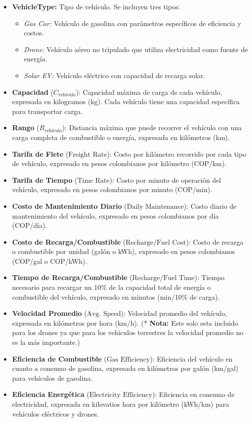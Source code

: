 \documentclass[12pt]{article}
\begin{document}
\begin{itemize}
    \item \textbf{VehicleType:} Tipo de vehículo. Se incluyen tres tipos:
    \begin{itemize}
        \item \textit{Gas Car:} Vehículo de gasolina con parámetros específicos de eficiencia y costos.
        \item \textit{Drone:} Vehículo aéreo no tripulado que utiliza electricidad como fuente de energía.
        \item \textit{Solar EV:} Vehículo eléctrico con capacidad de recarga solar.
    \end{itemize}
    \item \textbf{Capacidad} ($C_{\text{vehículo}}$): Capacidad máxima de carga de cada vehículo, expresada en kilogramos (kg). Cada vehículo tiene una capacidad específica para transportar carga.
    \item \textbf{Rango} ($R_{\text{vehículo}}$): Distancia máxima que puede recorrer el vehículo con una carga completa de combustible o energía, expresada en kilómetros (km).
    \item \textbf{Tarifa de Flete} ($\text{Freight Rate}$): Costo por kilómetro recorrido por cada tipo de vehículo, expresado en pesos colombianos por kilómetro (COP/km).
    \item \textbf{Tarifa de Tiempo} ($\text{Time Rate}$): Costo por minuto de operación del vehículo, expresado en pesos colombianos por minuto (COP/min).
    \item \textbf{Costo de Mantenimiento Diario} ($\text{Daily Maintenance}$): Costo diario de mantenimiento del vehículo, expresado en pesos colombianos por día (COP/día).
    \item \textbf{Costo de Recarga/Combustible} ($\text{Recharge/Fuel Cost}$): Costo de recarga o combustible por unidad (galón o kWh), expresado en pesos colombianos (COP/gal o COP/kWh).
    \item \textbf{Tiempo de Recarga/Combustible} ($\text{Recharge/Fuel Time}$): Tiempo necesario para recargar un 10\% de la capacidad total de energía o combustible del vehículo, expresado en minutos (min/10\% de carga).
    \item \textbf{Velocidad Promedio} ($\text{Avg. Speed}$): Velocidad promedio del vehículo, expresada en kilómetros por hora (km/h). (* \textbf{Nota:} Este solo esta incluido para los drones ya que para los vehiculos terrestres la velocidad promedio no es la más importante.)
    \item \textbf{Eficiencia de Combustible} ($\text{Gas Efficiency}$): Eficiencia del vehículo en cuanto a consumo de gasolina, expresada en kilómetros por galón (km/gal) para vehículos de gasolina.
    \item \textbf{Eficiencia Energética} ($\text{Electricity Efficiency}$): Eficiencia en consumo de electricidad, expresada en kilovatios hora por kilómetro (kWh/km) para vehículos eléctricos y drones.
\end{itemize}
\end{document}

